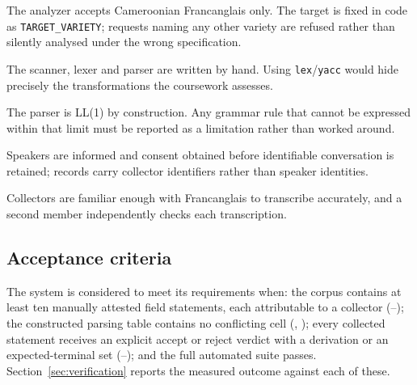 \begin{description}[leftmargin=1.4em, style=nextline, font=\bfseries]
  \item[Single target variety]
    The analyzer accepts Cameroonian Francanglais only. The target is fixed in code as
    \texttt{TARGET\_VARIETY}; requests naming any other variety are refused rather than
    silently analysed under the wrong specification.
  \item[No parser generator]
    The scanner, lexer and parser are written by hand. Using \texttt{lex}/\texttt{yacc}
    would hide precisely the transformations the coursework assesses.
  \item[One token of lookahead]
    The parser is LL(1) by construction. Any grammar rule that cannot be expressed within
    that limit must be reported as a limitation rather than worked around.
  \item[Ethical collection]
    Speakers are informed and consent obtained before identifiable conversation is
    retained; records carry collector identifiers rather than speaker identities.
  \item[Assumption]
    Collectors are familiar enough with Francanglais to transcribe accurately, and a
    second member independently checks each transcription.
\end{description}

\subsection{Acceptance criteria}

The system is considered to meet its requirements when: the corpus contains at least ten
manually attested field statements, each attributable to a collector (--);
the constructed parsing table contains no conflicting cell (, );
every collected statement receives an explicit accept or reject verdict with a derivation
or an expected-terminal set (--); and the full automated suite
passes. Section~\ref{sec:verification} reports the measured outcome against each of these.
